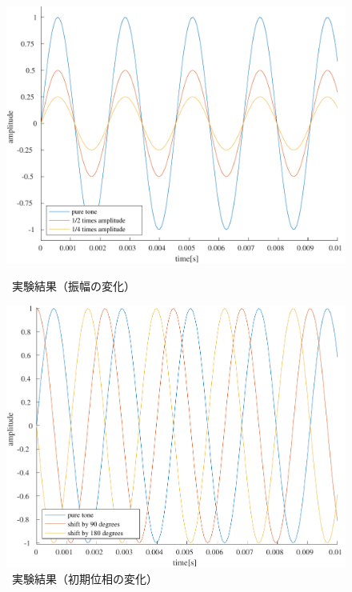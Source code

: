 \begin{figure}[H]
    \centering
    \begin{minipage}[b]{.48\textwidth}
        \centering
        \includegraphics[keepaspectratio,width=\textwidth]{../../Figures/01_02_1.pdf}
        \caption{\kadaiab\ 実験結果（振幅の変化）}
        \label{fig:\kadaiab_結果_振幅}
    \end{minipage}
    \begin{minipage}[b]{.48\textwidth}
        \centering
        \includegraphics[keepaspectratio,width=\textwidth]{../../Figures/01_02_2.pdf}
        \caption{\kadaiab\ 実験結果（初期位相の変化）}
        \label{fig:\kadaiab_結果_初期位相}
    \end{minipage}
\end{figure}
\consideration
